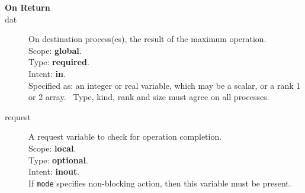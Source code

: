 \begin{description}
\item[\bf On Return]
\item[dat] On destination process(es), the result of the maximum operation.\\
Scope: {\bf global}.\\
Type: {\bf required}.\\
Intent: {\bf in}.\\
Specified as: an integer or  real variable, which may be a
scalar, or a rank 1 or 2 array. \
Type, kind, rank and size must agree on all processes.
\item[request] A request variable to check for operation completion.\\
Scope: {\bf local}.\\
Type: {\bf optional}.\\
Intent: {\bf inout}.\\
If \verb|mode| specifies non-blocking action, then this
variable must be present.
\end{description}


